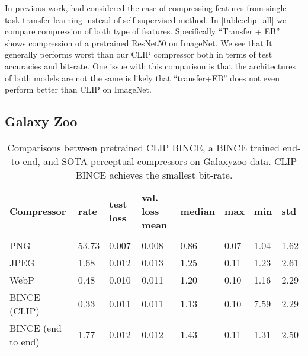 \documentclass[final]{article}
\begin{document}
In previous work, \citet{singh_end--end_2020} had considered the case of compressing features from single-task transfer learning instead of self-supervised method.
In \cref{table:clip_all} we compare compression of both type of features. Specifically ``Transfer + EB'' shows compression of a pretrained ResNet50 on ImageNet.
We see that It generally performs worst than our CLIP compressor both in terms of test accuracies and bit-rate.
One issue with this comparison is that the architectures of both models are not the same is likely that ``transfer+EB'' does not even perform better than CLIP on ImageNet.


\subsection{Galaxy Zoo}
\label{appx:galaxy}

\begin{table}[ht]
\small
\caption{Comparisons between pretrained CLIP BINCE, a BINCE trained end-to-end, and SOTA perceptual compressors on Galaxyzoo data. 
CLIP BINCE achieves the smallest bit-rate.
}
\begin{tabular}{llllllll}
\toprule
\textbf{Compressor}           & \textbf{rate} & \textbf{test loss} & \textbf{val. loss mean} & \textbf{median}  &  \textbf{max} & \textbf{min}                   &  \textbf{std }                                                 \\
   &      &  &  &   &  &                    &                                                              \\
\midrule
PNG              & 53.73 & 0.007   & 0.008       & 0.86        & 0.07                     & 1.04                     & 1.62   \\      
 JPEG              & 1.68 & 0.012   & 0.013        & 1.25         & 0.11                     & 1.23                     & 2.61    \\ 
 WebP              & 0.48  & 0.010  & 0.011        & 1.20         & 0.10                   & 1.16                     & 2.29       \\
\midrule
BINCE (CLIP) & 0.33  & 0.011    & 0.011        & 1.13         & 0.10                     & 7.59                     & 2.29   \\
BINCE (end to end)        & 1.77 & 0.012   & 0.012        & 1.43         & 0.11                     & 1.31                     & 2.50 \\
\bottomrule
\end{tabular}
\label{table:galaxy}
\end{table}
\end{document}
